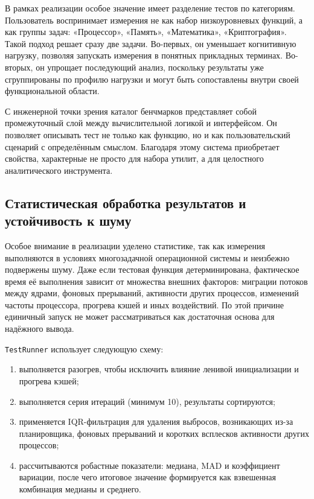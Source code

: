 В рамках реализации особое значение имеет разделение тестов по категориям. Пользователь воспринимает измерения не как набор низкоуровневых функций, а как группы задач: «Процессор», «Память», «Математика», «Криптография». Такой подход решает сразу две задачи. Во-первых, он уменьшает когнитивную нагрузку, позволяя запускать измерения в понятных прикладных терминах. Во-вторых, он упрощает последующий анализ, поскольку результаты уже сгруппированы по профилю нагрузки и могут быть сопоставлены внутри своей функциональной области.

С инженерной точки зрения каталог бенчмарков представляет собой промежуточный слой между вычислительной логикой и интерфейсом. Он позволяет описывать тест не только как функцию, но и как пользовательский сценарий с определённым смыслом. Благодаря этому система приобретает свойства, характерные не просто для набора утилит, а для целостного аналитического инструмента.

\subsection{Статистическая обработка результатов и устойчивость к шуму}

Особое внимание в реализации уделено статистике, так как измерения выполняются в условиях многозадачной операционной системы и неизбежно подвержены шуму. Даже если тестовая функция детерминирована, фактическое время её выполнения зависит от множества внешних факторов: миграции потоков между ядрами, фоновых прерываний, активности других процессов, изменений частоты процессора, прогрева кэшей и иных воздействий. По этой причине единичный запуск не может рассматриваться как достаточная основа для надёжного вывода.

\texttt{TestRunner} использует следующую схему:
\begin{enumerate}
    \item выполняется разогрев, чтобы исключить влияние ленивой инициализации и прогрева кэшей;
    \item выполняется серия итераций (минимум 10), результаты сортируются;
    \item применяется IQR-фильтрация для удаления выбросов, возникающих из-за планировщика, фоновых прерываний и коротких всплесков активности других процессов;
    \item рассчитываются робастные показатели: медиана, MAD и коэффициент вариации, после чего итоговое значение формируется как взвешенная комбинация медианы и среднего.
\end{enumerate}

